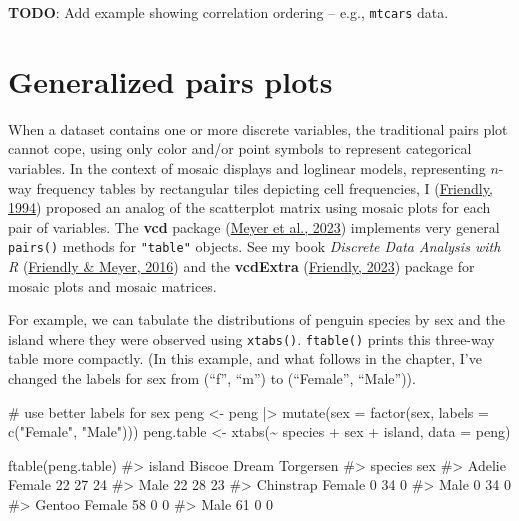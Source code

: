 \documentclass[
  letterpaper,
  10pt,
  krantz2]{krantz}
\makeatletter
\newenvironment{Shaded}{\begin{snugshade}}{\end{snugshade}}
\newcommand{\AttributeTok}[1]{\textcolor[rgb]{0.40,0.45,0.13}{#1}}
\newcommand{\CommentTok}[1]{\textcolor[rgb]{0.37,0.37,0.37}{#1}}
\newcommand{\FunctionTok}[1]{\textcolor[rgb]{0.28,0.35,0.67}{#1}}
\newcommand{\NormalTok}[1]{\textcolor[rgb]{0.00,0.23,0.31}{#1}}
\newcommand{\OtherTok}[1]{\textcolor[rgb]{0.00,0.23,0.31}{#1}}
\newcommand{\SpecialCharTok}[1]{\textcolor[rgb]{0.37,0.37,0.37}{#1}}
\newcommand{\StringTok}[1]{\textcolor[rgb]{0.13,0.47,0.30}{#1}}
\newenvironment{kframe}{%
  \medskip{}
  \setlength{\fboxsep}{.8em}
  \def\at@end@of@kframe{}%
  \ifinner\ifhmode%
  \def\at@end@of@kframe{\end{minipage}}%
  \begin{minipage}{\columnwidth}%
  \fi\fi%
  \def\FrameCommand##1{\hskip\@totalleftmargin \hskip-\fboxsep
  \colorbox{shadecolor}{##1}\hskip-\fboxsep
      \hskip-\linewidth \hskip-\@totalleftmargin \hskip\columnwidth}%
  \MakeFramed {\advance\hsize-\width
    \@totalleftmargin\z@ \linewidth\hsize
    \@setminipage}}%
{\par\unskip\endMakeFramed%
  \at@end@of@kframe}
\renewenvironment{Shaded}{\begin{kframe}}{\end{kframe}}
\makeatother
\begin{document}
\textbf{TODO}: Add example showing correlation ordering -- e.g.,
\texttt{mtcars} data.

\hypertarget{sec-ggpairs}{%
\section{Generalized pairs plots}\label{sec-ggpairs}}

When a dataset contains one or more discrete variables, the traditional
pairs plot cannot cope, using only color and/or point symbols to
represent categorical variables. In the context of mosaic displays and
loglinear models, representing \(n\)-way frequency tables by rectangular
tiles depicting cell frequencies, I
(\protect\hyperlink{ref-Friendly:94a}{Friendly, 1994}) proposed an
analog of the scatterplot matrix using mosaic plots for each pair of
variables. The \textbf{vcd} package (\protect\hyperlink{ref-R-vcd}{Meyer
et al., 2023}) implements very general \texttt{pairs()} methods for
\texttt{"table"} objects. See my book \emph{Discrete Data Analysis with
R} (\protect\hyperlink{ref-FriendlyMeyer:2016:DDAR}{Friendly \& Meyer,
2016}) and the \textbf{vcdExtra}
(\protect\hyperlink{ref-R-vcdExtra}{Friendly, 2023}) package for mosaic
plots and mosaic matrices.

For example, we can tabulate the distributions of penguin species by sex
and the island where they were observed using \texttt{xtabs()}.
\texttt{ftable()} prints this three-way table more compactly. (In this
example, and what follows in the chapter, I've changed the labels for
sex from (``f'', ``m'') to (``Female'', ``Male'')).

\begin{Shaded}
\begin{Highlighting}[]
\CommentTok{\# use better labels for sex}
\NormalTok{peng }\OtherTok{\textless{}{-}}\NormalTok{ peng }\SpecialCharTok{|\textgreater{}}
  \FunctionTok{mutate}\NormalTok{(}\AttributeTok{sex =} \FunctionTok{factor}\NormalTok{(sex, }\AttributeTok{labels =} \FunctionTok{c}\NormalTok{(}\StringTok{"Female"}\NormalTok{, }\StringTok{"Male"}\NormalTok{)))}
\NormalTok{peng.table }\OtherTok{\textless{}{-}} \FunctionTok{xtabs}\NormalTok{(}\SpecialCharTok{\textasciitilde{}}\NormalTok{ species }\SpecialCharTok{+}\NormalTok{ sex }\SpecialCharTok{+}\NormalTok{ island, }\AttributeTok{data =}\NormalTok{ peng)}

\FunctionTok{ftable}\NormalTok{(peng.table)}
\CommentTok{\#\textgreater{}                  island Biscoe Dream Torgersen}
\CommentTok{\#\textgreater{} species   sex                                 }
\CommentTok{\#\textgreater{} Adelie    Female            22    27        24}
\CommentTok{\#\textgreater{}           Male              22    28        23}
\CommentTok{\#\textgreater{} Chinstrap Female             0    34         0}
\CommentTok{\#\textgreater{}           Male               0    34         0}
\CommentTok{\#\textgreater{} Gentoo    Female            58     0         0}
\CommentTok{\#\textgreater{}           Male              61     0         0}
\end{Highlighting}
\end{Shaded}
\end{document}
